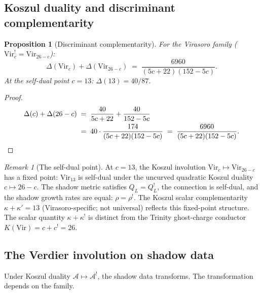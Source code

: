 \documentclass[11pt,reqno]{amsart}
\newtheorem{proposition}[theorem]{Proposition}
\theoremstyle{definition}
\theoremstyle{remark}
\newtheorem{remark}[theorem]{Remark}
\newcommand{\cA}{\mathcal{A}}
\newcommand{\Vir}{\mathrm{Vir}}
\numberwithin{equation}{section}
\begin{document}
\subsection{Koszul duality and discriminant
complementarity}\label{subsec:complementarity}

\begin{proposition}[Discriminant
complementarity]\label{prop:complementarity}
For the Virasoro family ($\Vir_c^! = \Vir_{26-c}$):
\begin{equation}\label{eq:complementarity}
 \Delta(\Vir_c) + \Delta(\Vir_{26-c})
 \;=\;
 \frac{6960}{(5c+22)(152-5c)}.
\end{equation}
At the self-dual point $c = 13$:
$\Delta(13) = 40/87$.
\end{proposition}

\begin{proof}
\begin{align*}
 \Delta(c) + \Delta(26-c)
 &\;=\;
 \frac{40}{5c+22} + \frac{40}{152-5c} \\
 &\;=\;
 40 \cdot \frac{174}{(5c+22)(152-5c)}
 \;=\;
 \frac{6960}{(5c+22)(152-5c)}.
 \qedhere
\end{align*}
\end{proof}

\begin{remark}[The self-dual point]\label{rem:self-dual}
At $c = 13$, the Koszul involution
$\Vir_c \mapsto \Vir_{26-c}$ has a fixed point:
$\Vir_{13}$ is self-dual under the uncurved quadratic
Koszul duality $c \mapsto 26 - c$.
The shadow metric satisfies
$Q_L = Q_L^!$, the connection is self-dual, and the
shadow growth rates are equal: $\rho = \rho^!$.
The Koszul scalar complementarity $\kappa + \kappa' = 13$
(Virasoro-specific; not universal) reflects this fixed-point
structure. The scalar quantity $\kappa + \kappa^!$ is distinct from
the Trinity ghost-charge conductor $K(\Vir)=c+c^!=26$.
\end{remark}

\subsection{The Verdier involution on shadow
data}\label{subsec:verdier}

Under Koszul duality $\cA \mapsto \cA^!$, the shadow data
transforms. The transformation depends on the family.
\end{document}
